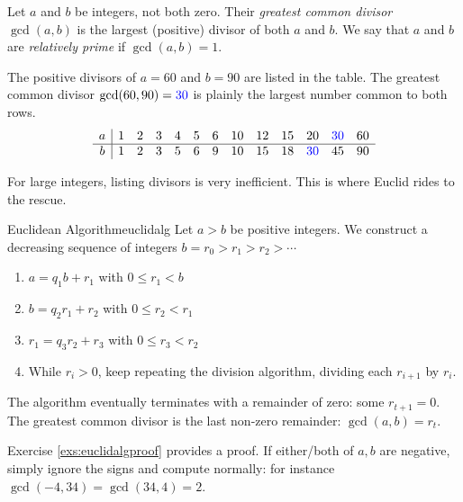 \begin{defn}{}{}
	Let $a$ and $b$ be integers, not both zero. Their \emph{greatest common divisor} $\gcd(a,b)$ is the largest (positive) divisor of both $a$ and $b$. We say that $a$ and $b$ are \emph{relatively prime} if $\gcd(a,b)=1$.
\end{defn}

\begin{example}{}{}
	The positive divisors of $a=60$ and $b=90$ are listed in the table. The greatest common divisor $\gcd(60,90)=\textcolor{blue}{30}$ is plainly the largest number common to both rows.
	\[
		\begin{array}{c|cccccccccccc}
			a&1&2&3&4&5&6&10&12&15&20&\textcolor{blue}{30}&60\\\hline
			b&1&2&3&5&6&9&10&15&18&\textcolor{blue}{30}&45&90
		\end{array}
	\]
\end{example}

For large integers, listing divisors is very inefficient. This is where Euclid rides to the rescue.

\begin{thm}{Euclidean Algorithm}{euclidalg}
	Let $a>b$ be positive integers. We construct a decreasing sequence of integers $b=r_0>r_1>r_2>\cdots$
	\begin{enumerate}\itemsep1pt
		\item {}$a=q_1b+r_1$ with $0\le r_1<b$
		\item {}$b=q_2r_1+r_2$ with $0\le r_2<r_1$
		\item {}$r_1=q_3r_2+r_3$ with $0\le r_3<r_2$
		\item While $r_i>0$, keep repeating the division algorithm, dividing each $r_{i+1}$ by $r_i$.
	\end{enumerate}
	The algorithm eventually terminates with a remainder of zero: some $r_{t+1}=0$. The greatest common divisor is the last non-zero remainder: $\gcd(a,b)=r_t$.
\end{thm}

Exercise \ref{exs:euclidalgproof} provides a proof. If either/both of $a,b$ are negative, simply ignore the signs and compute normally: for instance $\gcd(-4,34)=\gcd(34,4)=2$.

